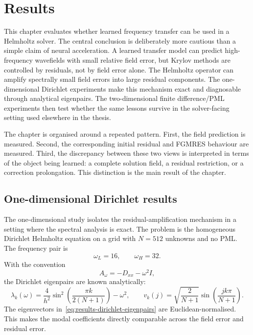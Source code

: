 
\chapter{Results}
\label{chapter:results}

This chapter evaluates whether learned frequency transfer can be used in a
Helmholtz solver. The central conclusion is deliberately more cautious than a
simple claim of neural acceleration. A learned transfer model can predict
high-frequency wavefields with small relative field error, but Krylov methods
are controlled by residuals, not by field error alone. The Helmholtz operator
can amplify spectrally small field errors into large residual components. The
one-dimensional Dirichlet experiments make this mechanism exact and
diagnosable through analytical eigenpairs. The two-dimensional finite
difference/PML experiments then test whether the same lessons survive in the
solver-facing setting used elsewhere in the thesis.

The chapter is organised around a repeated pattern. First, the field prediction
is measured. Second, the corresponding initial residual and FGMRES behaviour
are measured. Third, the discrepancy between these two views is interpreted in
terms of the object being learned: a complete solution field, a residual
restriction, or a correction prolongation. This distinction is the main result
of the chapter.

\section{One-dimensional Dirichlet results}
\label{sec:results-1d-dirichlet}

The one-dimensional study isolates the residual-amplification mechanism in a
setting where the spectral analysis is exact. The problem is the homogeneous
Dirichlet Helmholtz equation on a grid with $N=512$ unknowns and no PML. The
frequency pair is
\begin{equation}
    \omega_L = 16,
    \qquad
    \omega_H = 32.
\end{equation}
With the convention
\begin{equation}
    A_\omega = -D_{xx} - \omega^2 I,
\end{equation}
the Dirichlet eigenpairs are known analytically:
\begin{equation}
    \lambda_k(\omega)
    =
    \frac{4}{h^2}
    \sin^2\!\left(\frac{\pi k}{2(N+1)}\right)
    -
    \omega^2,
    \qquad
    v_k(j)
    =
    \sqrt{\frac{2}{N+1}}
    \sin\!\left(\frac{j k \pi}{N+1}\right).
    \label{eq:results-dirichlet-eigenpairs}
\end{equation}
The eigenvectors in~\eqref{eq:results-dirichlet-eigenpairs} are
Euclidean-normalised. This makes the modal coefficients directly comparable
across the field error and residual error.


